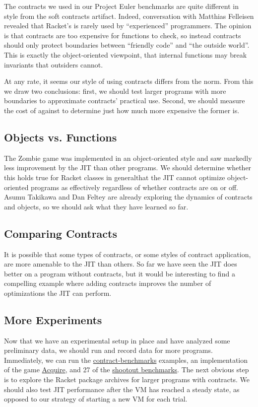 The contracts we used in our Project Euler benchmarks are quite different in style from the soft contracts artifact.
Indeed, conversation with Matthias Felleisen revealed that Racket's  is rarely used by ``experienced'' programmers.
The opinion is that contracts are too expensive for functions to check, so instead contracts should only protect boundaries between ``friendly code'' and ``the outside world''.
This is exactly the object-oriented viewpoint, that internal functions may break invariants that outsiders cannot.

At any rate, it seems our style of using contracts differs from the norm.
From this we draw two conclusions: first, we should test larger programs with more boundaries to approximate contracts' practical use.
Second, we should measure the cost of  against  to determine just how much more expensive the former is.

\subsection{Objects vs. Functions}

The Zombie game was implemented in an object-oriented style and saw markedly less improvement by the JIT than other programs.
We should determine whether this holds true for Racket classes in general\textemdash that the JIT cannot optimize object-oriented programs as effectively regardless of whether contracts are on or off.
Asumu Takikawa and Dan Feltey are already exploring the dynamics of contracts and objects, so we should ask what they have learned so far.

\subsection{Comparing Contracts}
It is possible that some types of contracts, or some styles of contract application, are more amenable to the JIT than others.
So far we have seen the JIT does better on a program without contracts, but it would be interesting to find a compelling example where adding contracts improves the number of optimizations the JIT can perform.

\subsection{More Experiments}

Now that we have an experimental setup in place and have analyzed some preliminary data, we should run and record data for more programs.
Immediately, we can run the \href{https://github.com/stamourv/contract-benchmarks}{contract-benchmarks} examples, an implementation of the game \href{https://github.com/LeifAndersen/experimental-methods-in-pl/tree/master/Acquire}{Acquire}, and 27 of the \href{https://github.com/LeifAndersen/experimental-methods-in-pl/tree/master/shootout}{shootout benchmarks}.
The next obvious step is to explore the Racket package archives for larger programs with contracts.
We should also test JIT performance after the VM has reached a steady state, as opposed to our strategy of starting a new VM for each trial.

